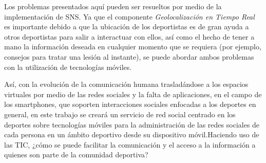 Los problemas presentados aquí pueden ser resueltos por medio de la implementación de SNS. Ya que el componente \textit{Geolocalización en
Tiempo Real} es importante debido a que la ubicación de los deportistas es de gran ayuda a otros deportistas para salir a interactuar con ellos,
así como el hecho de tener a mano la información deseada en cualquier momento que se requiera (por ejemplo, consejos para tratar una
lesión al instante), se puede abordar ambos problemas con la utilización de tecnologías móviles.

Así, con la evolución de la comunicación humana trasladándose a los espacios virtuales por medio de las redes sociales y la falta de
aplicaciones, en el campo de los smartphones, que soporten interacciones sociales enfocadas a los deportes en general, en este trabajo se
creará un servicio de red social centrado en los deportes sobre tecnologías móviles para la administración de las redes sociales de cada
persona en un ámbito deportivo desde su dispositivo móvil.Haciendo uso de las TIC, ¿cómo se puede facilitar la comunicación y el acceso a la información a quienes son parte de la comunidad
deportiva?
